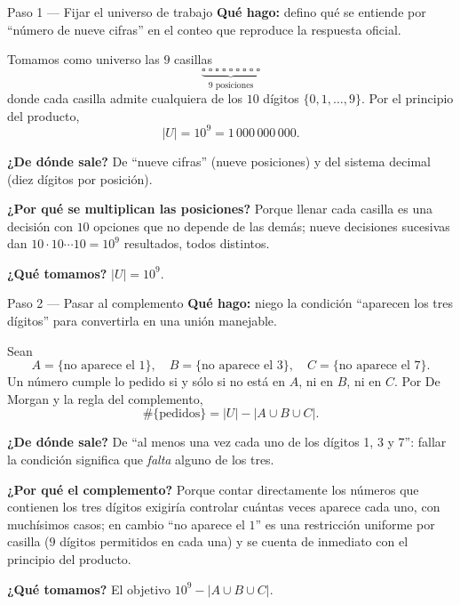\documentclass[11pt]{article}
\begin{document}
\begin{paso}{Paso 1 --- Fijar el universo de trabajo}
\textbf{Qué hago:} defino qué se entiende por ``número de nueve cifras'' en el conteo que reproduce la respuesta oficial.

Tomamos como universo las $9$ casillas
\[
\underbrace{\square\ \square\ \square\ \square\ \square\ \square\ \square\ \square\ \square}_{9 \text{ posiciones}}
\]
donde cada casilla admite cualquiera de los $10$ dígitos $\{0,1,\dots,9\}$. Por el principio del producto,
\[
|U| = 10^{9} = 1\,000\,000\,000 .
\]

\textbf{¿De dónde sale?} De ``nueve cifras'' (nueve posiciones) y del sistema decimal (diez dígitos por posición).

\textbf{¿Por qué se multiplican las posiciones?} Porque llenar cada casilla es una decisión con $10$ opciones que no depende de las demás; nueve decisiones sucesivas dan $10\cdot 10\cdots 10 = 10^9$ resultados, todos distintos.

\textbf{¿Qué tomamos?} $|U| = 10^9$.
\end{paso}

\begin{paso}{Paso 2 --- Pasar al complemento}
\textbf{Qué hago:} niego la condición ``aparecen los tres dígitos'' para convertirla en una unión manejable.

Sean
\[
A = \{\text{no aparece el }1\},\quad B=\{\text{no aparece el }3\},\quad C=\{\text{no aparece el }7\} .
\]
Un número cumple lo pedido si y sólo si no está en $A$, ni en $B$, ni en $C$. Por De Morgan y la regla del complemento,
\[
\#\{\text{pedidos}\} = |U| - |A\cup B\cup C| .
\]

\textbf{¿De dónde sale?} De ``al menos una vez cada uno de los dígitos 1, 3 y 7'': fallar la condición significa que \emph{falta} alguno de los tres.

\textbf{¿Por qué el complemento?} Porque contar directamente los números que contienen los tres dígitos exigiría controlar cuántas veces aparece cada uno, con muchísimos casos; en cambio ``no aparece el $1$'' es una restricción uniforme por casilla ($9$ dígitos permitidos en cada una) y se cuenta de inmediato con el principio del producto.

\textbf{¿Qué tomamos?} El objetivo $10^9 - |A\cup B\cup C|$.
\end{paso}
\end{document}
